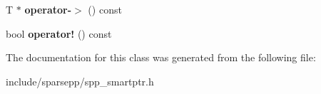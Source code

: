 \begin{DoxyCompactItemize}
\item 
T $\ast$ {\bfseries operator-\/$>$} () const \hypertarget{classspp__sptr_a18a2270b185b8b35b3f0446d7223f73c}{}\label{classspp__sptr_a18a2270b185b8b35b3f0446d7223f73c}

\item 
bool {\bfseries operator!} () const \hypertarget{classspp__sptr_a8ebd1672a8fab94038169d3a82675913}{}\label{classspp__sptr_a8ebd1672a8fab94038169d3a82675913}

\end{DoxyCompactItemize}


The documentation for this class was generated from the following file\+:\begin{DoxyCompactItemize}
\item 
include/sparsepp/spp\+\_\+smartptr.\+h\end{DoxyCompactItemize}
